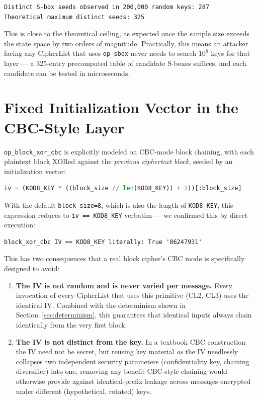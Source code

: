 \documentclass[11pt]{article}
\begin{document}
\begin{lstlisting}
Distinct S-box seeds observed in 200,000 random keys: 287
Theoretical maximum distinct seeds: 325
\end{lstlisting}

\noindent
This is close to the theoretical ceiling, as expected once the sample
size exceeds the state space by two orders of magnitude. Practically,
this means an attacker facing any CipherList that uses \texttt{op\_sbox}
never needs to search $10^{8}$ keys for that layer — a 325-entry
precomputed table of candidate S-boxes suffices, and each candidate can
be tested in microseconds.

\section{Fixed Initialization Vector in the CBC-Style Layer}
\label{sec:iv}

\texttt{op\_block\_xor\_cbc} is explicitly modeled on CBC-mode block
chaining, with each plaintext block XORed against the \emph{previous
ciphertext block}, seeded by an initialization vector:

\begin{lstlisting}[language=Python]
iv = (KOD8_KEY * ((block_size // len(KOD8_KEY)) + 1))[:block_size]
\end{lstlisting}

With the default \texttt{block\_size=8}, which is also the length of
\texttt{KOD8\_KEY}, this expression reduces to \texttt{iv == KOD8\_KEY}
verbatim — we confirmed this by direct execution:

\begin{lstlisting}
block_xor_cbc IV == KOD8_KEY literally: True '86247931'
\end{lstlisting}

This has two consequences that a real block cipher's CBC mode is
specifically designed to avoid:

\begin{enumerate}[leftmargin=1.6em]
\item \textbf{The IV is not random and is never varied per message.}
Every invocation of every CipherList that uses this primitive
(CL2, CL3) uses the identical IV. Combined with the determinism shown in
Section~\ref{sec:determinism}, this guarantees that identical inputs
always chain identically from the very first block.
\item \textbf{The IV is not distinct from the key.} In a textbook CBC
construction the IV need not be secret, but reusing key material
\emph{as} the IV needlessly collapses two independent security
parameters (confidentiality key, chaining diversifier) into one,
removing any benefit CBC-style chaining would otherwise provide against
identical-prefix leakage across messages encrypted under different
(hypothetical, rotated) keys.
\end{enumerate}
\end{document}
